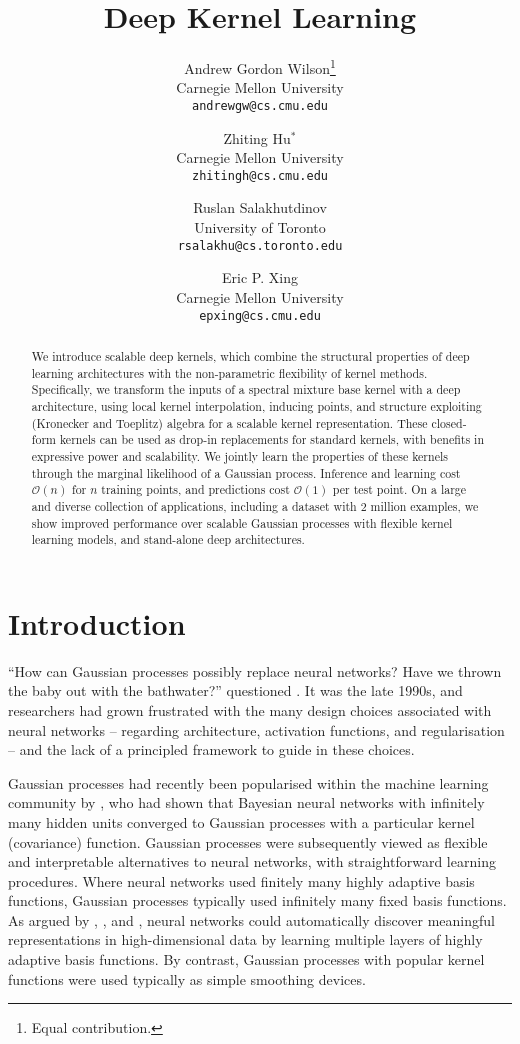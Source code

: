 \documentclass[twoside,11pt]{article}
\title{Deep Kernel Learning}
\author{
  Andrew Gordon Wilson\footnote{Equal contribution.} \\
  Carnegie Mellon University \\
  \texttt{andrewgw@cs.cmu.edu}
  \and
  Zhiting Hu$^{*}$ \\
  Carnegie Mellon University \\
  \texttt{zhitingh@cs.cmu.edu}
  \and
  Ruslan Salakhutdinov \\
  University of Toronto \\
  \texttt{rsalakhu@cs.toronto.edu}
  \and
  Eric P. Xing \\
  Carnegie Mellon University \\
  \texttt{epxing@cs.cmu.edu}
}
\renewcommand{\footnotesize}{\normalsize}
\begin{document}
\date{}  


\maketitle

\begin{abstract} 

\begin{sloppypar}
We introduce scalable deep kernels, which combine the structural properties of deep learning
architectures with the non-parametric flexibility of kernel methods.  Specifically, we transform
the inputs of a spectral mixture base kernel with a deep architecture, using local kernel
interpolation, inducing points, and structure exploiting (Kronecker and Toeplitz) algebra
for a scalable kernel representation.  These closed-form kernels can be
used as drop-in replacements for standard kernels, with benefits in expressive power and scalability.
We jointly learn the properties of these kernels through the marginal likelihood of a Gaussian process.
Inference and learning cost $\mathcal{O}(n)$ for $n$ training points, and predictions cost
$\mathcal{O}(1)$ per test point.  On a large and diverse collection of applications, including a
dataset with $2$ million examples, we show improved performance over
scalable Gaussian processes with flexible kernel learning models, and stand-alone deep architectures.
\end{sloppypar}

\end{abstract} 


\section{Introduction}
\label{sec: intro}

``How can Gaussian processes possibly replace neural networks?  Have we thrown the
baby out with the bathwater?'' questioned \citet{MacKay98}.  It was the late 1990s, and researchers had grown frustrated with the many
design choices associated with neural networks -- regarding architecture, activation functions, and regularisation -- and the lack of a principled
framework to guide in these choices.

Gaussian processes had recently been popularised within the machine learning community by
\citet{neal1996}, who had shown that Bayesian neural networks with infinitely many
hidden units converged to Gaussian processes with a particular kernel (covariance) function.
Gaussian processes were subsequently viewed as flexible and interpretable alternatives to
neural networks, with straightforward learning procedures.  Where neural networks used finitely
many highly adaptive basis functions, Gaussian processes typically used infinitely many
fixed basis functions.
As argued by \citet{MacKay98}, \citet{HOT}, and \citet{Bengio2009}, neural networks could automatically discover meaningful representations in high-dimensional
data by
learning multiple layers of highly adaptive basis functions.
By contrast, Gaussian processes with popular kernel functions were
used typically as simple smoothing devices.
\end{document}
